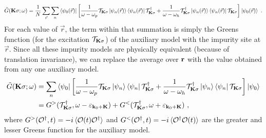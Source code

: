 \documentclass[reprint,hidelinks,onecolumn]{revtex4-2}
\begin{document}
\begin{equation}\begin{aligned}
	\tilde G({\bf K}\sigma; \omega) = \frac{1}{N}\sum_{\vec r}\sum_n \braket{\psi_{0}(\vec r) | \left[\frac{1}{\omega - \omega_p} \mathcal{T}_{{\bf K}\sigma} \ket{\psi_n(\vec r)}\bra{\psi_n(\vec r)} \mathcal{T}_{{\bf K}\sigma}^\dagger + \frac{1}{\omega - \omega_h} \mathcal{T}^\dagger_{{\bf K}\sigma} \ket{\psi_n(\vec r)}\bra{\psi_n(\vec r)} \mathcal{T}_{{\bf K}\sigma}\right] | \psi_{0}(\vec r)} ~.
\end{aligned}\end{equation}
For each value of \({\vec r}\), the term within that summation is simply the Greens function (for the excitation \(\mathcal{T}_{{\bf K}\sigma}\)) of the auxiliary model with the impurity site at \({\vec r}\). Since all these impurity models are physically equivalent (because of translation invariance), we can replace the average over \({\bf r}\) with the value obtained from any one auxiliary model.
\begin{equation}\begin{aligned}\label{kspaceGreensFunction}
	\tilde G({\bf K}\sigma; \omega) &= \sum_n \braket{\psi_{0} | \left[\frac{1}{\omega - \omega_p} \mathcal{T}_{{\bf K}\sigma} \ket{\psi_n}\bra{\psi_n} \mathcal{T}_{{\bf K}\sigma}^\dagger + \frac{1}{\omega - \omega_h} \mathcal{T}^\dagger_{{\bf K}\sigma} \ket{\psi_n}\bra{\psi_n} \mathcal{T}_{{\bf K}\sigma}\right] | \psi_{0}} \\
									&= G^>(\mathcal{T}^\dagger_{{\bf K}\sigma}, \omega - \varepsilon_{{\bf k}_0 + {\bf K}}) + G^<(\mathcal{T}^\dagger_{{\bf K}\sigma}, \omega + \varepsilon_{{\bf k}_0 + {\bf K}})~,
\end{aligned}\end{equation}
where \(G^>(\mathcal{O}^\dagger, t) = -i\braket{\mathcal{O}(t)\mathcal{O}^\dagger}\) and \(G^<(\mathcal{O}^\dagger, t) = -i\braket{\mathcal{O}^\dagger\mathcal{O}(t)}\) are the greater and lesser Greens function for the auxiliary model.
\end{document}
